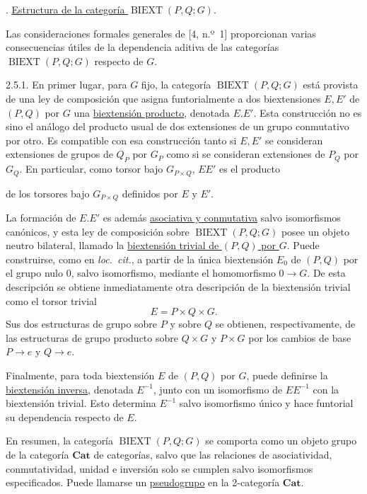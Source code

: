 \par\medskip{}. \underline{Estructura de la categoría
$\operatorname{BIEXT}(P,Q;G)$}.

Las consideraciones formales generales de [4, n.º~1] proporcionan
varias consecuencias útiles de la dependencia aditiva de las
categorías $\operatorname{BIEXT}(P,Q;G)$ respecto de $G$.

2.5.1. En primer lugar, para $G$ fijo, la categoría
$\operatorname{BIEXT}(P,Q;G)$ está provista de una ley de composición
que asigna funtorialmente a dos biextensiones $E,E'$ de $(P,Q)$ por
$G$ una \underline{biextensión producto}, denotada $E.E'$. Esta
construcción no es sino el análogo del producto usual de dos
extensiones de un grupo conmutativo por otro. Es compatible con esa
construcción tanto si $E,E'$ se consideran extensiones de grupos de
$Q_P$ por $G_P$ como si se consideran extensiones de $P_Q$ por $G_Q$.
En particular, como torsor bajo $G_{P\times Q}$, $EE'$ es el producto


de los torsores bajo $G_{P\times Q}$ definidos por $E$ y $E'$.

La formación de $E.E'$ es además \underline{asociativa y conmutativa}
salvo isomorfismos canónicos, y esta ley de composición sobre
$\operatorname{BIEXT}(P,Q;G)$ posee un objeto neutro bilateral,
llamado la \underline{biextensión trivial de $(P,Q)$ por $G$}. Puede
construirse, como en \emph{loc.\ cit.}, a partir de la única
biextensión $E_0$ de $(P,Q)$ por el grupo nulo $0$, salvo isomorfismo,
mediante el homomorfismo $0\longrightarrow G$. De esta descripción se
obtiene inmediatamente otra descripción de la biextensión trivial como
el torsor trivial
\[
 E=P\times Q\times G.
\]
Sus dos estructuras de grupo sobre $P$ y sobre $Q$ se obtienen,
respectivamente, de las estructuras de grupo producto sobre
$Q\times G$ y $P\times G$ por los cambios de base
$P\longrightarrow e$ y $Q\longrightarrow e$.

Finalmente, para toda biextensión $E$ de $(P,Q)$ por $G$, puede
definirse la \underline{biextensión inversa}, denotada $E^{-1}$, junto
con un isomorfismo de $EE^{-1}$ con la biextensión trivial. Esto
determina $E^{-1}$ salvo isomorfismo único y hace funtorial su
dependencia respecto de $E$.

En resumen, la categoría $\operatorname{BIEXT}(P,Q;G)$ se comporta
como un objeto grupo de la categoría $\mathbf{Cat}$ de categorías,
salvo que las relaciones de asociatividad, conmutatividad, unidad e
inversión solo se cumplen salvo isomorfismos especificados. Puede
llamarse un \underline{pseudogrupo} en la 2-categoría $\mathbf{Cat}$.

